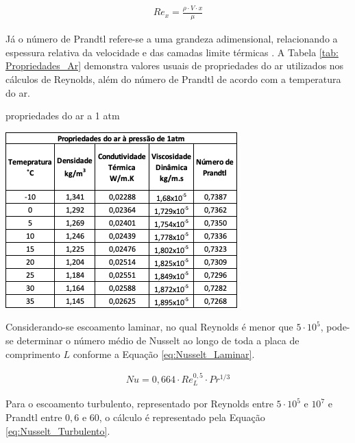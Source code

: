 \documentclass[acronym,symbols,table]{fei}
\begin{document}
\begin{equation} \label{eq:Reynolds}
\begin{aligned}
    {Re}_{x}=\frac{\rho \cdot V \cdot x}{\mu}
\end{aligned}
\end{equation}

Já o número de Prandtl refere-se a uma grandeza adimensional, relacionando a espessura relativa da velocidade e das camadas limite térmicas \cite{cengel1998heat}. A Tabela \ref{tab: Propriedades_Ar} demonstra valores usuais de propriedades do ar utilizados nos cálculos de Reynolds, além do número de Prandtl de acordo com a temperatura do ar.

\begin{table}[!htb] 
 \centering
    \caption{propriedades do ar a 1 atm}
    \includegraphics[width=0.7\linewidth]{Tabelas/Propriedades_ar_1atm.png}
    \label{tab: Propriedades_Ar}
\end{table}

Considerando-se escoamento laminar, no qual Reynolds é menor que $5 \cdot 10^5$, pode-se determinar o número médio de Nusselt ao longo de toda a placa de comprimento $L$ conforme a Equação \ref{eq:Nusselt_Laminar}.

\begin{equation} \label{eq:Nusselt_Laminar}
\begin{aligned}
    Nu=0,664 \cdot Re_{L}^{0,5} \cdot Pr^{1/3}
\end{aligned}
\end{equation}

Para o escoamento turbulento, representado por Reynolds entre $5 \cdot 10^5$ e $10^7$ e Prandtl entre $0,6$ e $60$, o cálculo é representado pela Equação \ref{eq:Nusselt_Turbulento}.
\end{document}
